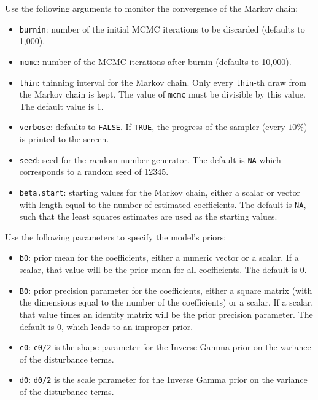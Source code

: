Use the following arguments to monitor the convergence of the Markov
chain:  
\begin{itemize}
\item \texttt{burnin}: number of the initial MCMC iterations to be 
 discarded (defaults to 1,000).

\item \texttt{mcmc}: number of the MCMC iterations after burnin
(defaults to 10,000).

\item \texttt{thin}: thinning interval for the Markov chain. Only every 
 \texttt{thin}-th draw from the Markov chain is kept. The value of
\texttt{mcmc} must be divisible by this value. The default value is 1.

\item \texttt{verbose}: defaults to {\tt FALSE}.  If \texttt{TRUE},
the progress of the sampler (every $10\%$) is printed to the screen.

\item \texttt{seed}: seed for the random number generator. The default is 
\texttt{NA} which corresponds to a random seed of 12345. 

\item \texttt{beta.start}: starting values for the Markov 
chain, either a scalar or vector with length equal to the number 
of estimated coefficients. The default is \texttt{NA}, such that the
least squares estimates are used as the starting values.  

\end{itemize}

Use the following parameters to specify the model's priors:  
\begin{itemize}
\item \texttt{b0}: prior mean for the coefficients, either a numeric
vector or a scalar. If a scalar, that value will be the prior mean for
all coefficients. The default is 0.

\item \texttt{B0}: prior precision parameter for the coefficients,
either a square matrix (with the dimensions equal to the number of the
coefficients) or a scalar. If a scalar, that value times an identity
matrix will be the prior precision parameter. The default is 0, which
leads to an improper prior.

\item \texttt{c0}: \texttt{c0/2} is the shape parameter for the Inverse Gamma
prior on the variance of the disturbance terms. 

\item \texttt{d0}: \texttt{d0/2} is the scale parameter for the Inverse Gamma
prior on the variance of the disturbance terms. 

\end{itemize}

